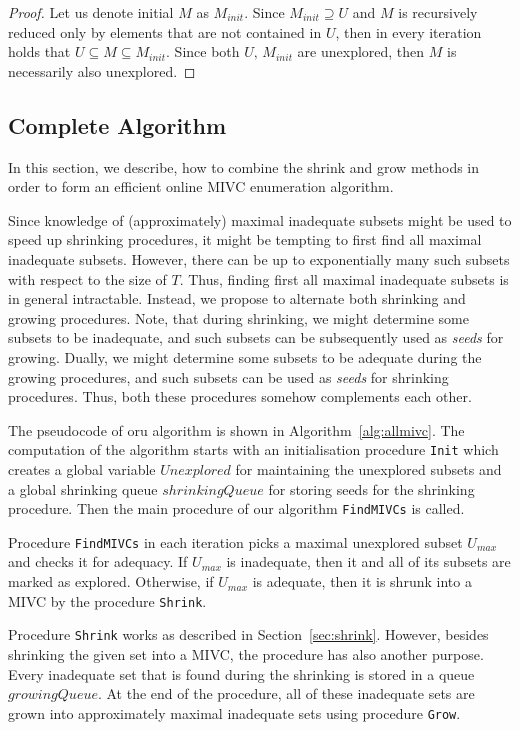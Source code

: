 \begin{proof}
Let us denote initial $M$ as $M_{init}$. Since $M_{init} \supseteq U$ and $M$ is recursively reduced only by elements that are not contained in $U$, then in every iteration holds that $U \subseteq M \subseteq M_{init}$. Since both $U, \, M_{init}$ are unexplored, then $M$ is necessarily also unexplored.
\end{proof}



\subsection{Complete Algorithm}
In this section, we describe, how to combine the shrink and grow methods in order to form an efficient online MIVC enumeration algorithm.

Since knowledge of (approximately) maximal inadequate subsets might be used to speed up shrinking procedures, it might be tempting to first find all maximal inadequate subsets. However, there can be up to exponentially many such subsets with respect to the size of $T$. Thus, finding first all maximal inadequate subsets is in general intractable. Instead, we propose to alternate both shrinking and growing procedures. Note, that during shrinking, we might determine some subsets to be inadequate, and such subsets can be subsequently used as \emph{seeds} for growing. Dually, we might determine some subsets to be adequate during the growing procedures, and such subsets can be used as \emph{seeds} for shrinking procedures. Thus, both these procedures somehow complements each other.

The pseudocode of oru algorithm is shown in Algorithm~\ref{alg:allmivc}. The computation of the algorithm starts with an initialisation procedure \texttt{Init} which creates a global variable $\mathit{Unexplored}$ for maintaining the unexplored subsets and a global shrinking queue $\mathit{shrinkingQueue}$ for storing seeds for the shrinking procedure. Then the main procedure of our algorithm \texttt{FindMIVCs} is called. 

Procedure \texttt{FindMIVCs} in each iteration picks a maximal unexplored subset $U_{max}$ and checks it for adequacy. If $U_{max}$ is inadequate, then it and all of its subsets are marked as explored. Otherwise, if $U_{max}$ is adequate, then it is shrunk into a MIVC by the procedure \texttt{Shrink}. 

Procedure \texttt{Shrink} works as described in Section~\ref{sec:shrink}. However, besides shrinking the given set into a MIVC, the procedure has also another purpose. Every inadequate set that is found during the shrinking is stored in a queue $\mathit{growingQueue}$. At the end of the procedure, all of these inadequate sets are grown into approximately maximal inadequate sets using procedure \texttt{Grow}.

